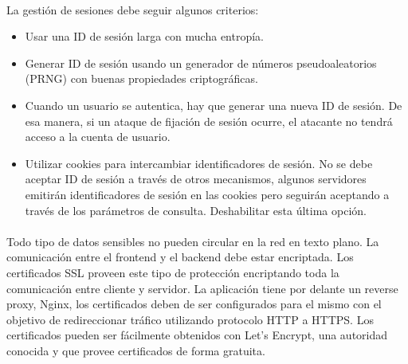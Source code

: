 \paragraph{}
La gestión de sesiones debe seguir algunos criterios:
\begin{itemize}
\item{Usar una ID de sesión larga con mucha entropía.}
\item{Generar ID de sesión usando un generador de números pseudoaleatorios (PRNG) con buenas propiedades criptográficas.}
\item{Cuando un usuario se autentica, hay que generar una nueva ID de sesión. De esa manera, si un ataque de fijación de sesión ocurre, el atacante no tendrá acceso a la cuenta de usuario.}
\item{Utilizar cookies para intercambiar identificadores de sesión. No se debe aceptar ID de sesión a través de otros mecanismos, algunos servidores emitirán identificadores de sesión en las cookies pero seguirán aceptando a través de los parámetros de consulta. Deshabilitar esta última opción.}
\end{itemize}
\paragraph{}
Todo tipo de datos sensibles no pueden circular en la red en texto plano. La comunicación entre el frontend y el backend debe estar encriptada. Los certificados SSL proveen este tipo de protección encriptando toda la comunicación entre cliente y servidor. La aplicación tiene por delante un reverse proxy, Nginx, los certificados deben de ser configurados para el mismo con el objetivo de redireccionar tráfico utilizando protocolo HTTP a HTTPS. Los certificados pueden ser fácilmente obtenidos con Let’s Encrypt, una autoridad conocida y que provee certificados de forma gratuita.
